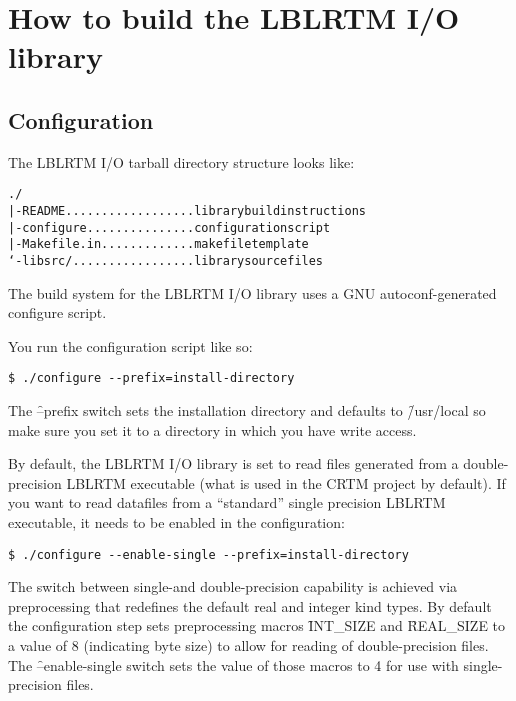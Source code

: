 \chapter{How to build the LBLRTM I/O library}
\label{chapter:build}

\section{Configuration}

The LBLRTM I/O tarball directory structure looks like:
\begin{alltt} ./
  |-README  .................. library build instructions
  |-configure  ............... configuration script
  |-Makefile.in  ............. makefile template
  `-libsrc/  ................. library source files\end{alltt}

The build system for the LBLRTM I/O library uses a GNU autoconf-generated configure script.

You run the configuration script like so:

\begin{verbatim}$ ./configure --prefix=install-directory\end{verbatim}

The \f{--prefix} switch sets the installation directory and defaults to \f{/usr/local} so make sure you set it to a directory in which you have write access.

By default, the LBLRTM I/O library is set to read files generated from a double-precision LBLRTM executable (what is used in the CRTM project by default). If you want to read datafiles from a ``standard'' single precision LBLRTM executable, it needs to be enabled in the configuration:

\begin{verbatim}$ ./configure --enable-single --prefix=install-directory\end{verbatim}

The switch between single-and double-precision capability is achieved via preprocessing that redefines the default real and integer kind types. By default the configuration step sets preprocessing macros \f{INT\_SIZE} and \f{REAL\_SIZE} to a value of 8 (indicating byte size) to allow for reading of double-precision files. The \f{--enable-single} switch sets the value of those macros to 4 for use with single-precision files.

